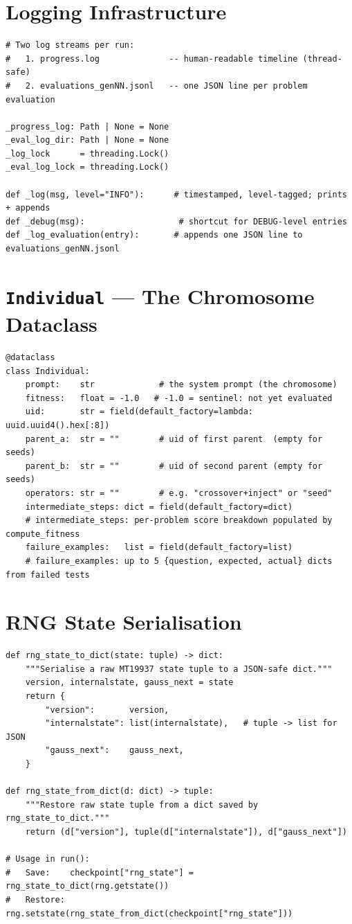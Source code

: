 \documentclass[11pt,a4paper]{report}
\newcommand{\fn}[1]{\texttt{#1}}
\begin{document}
\section{Logging Infrastructure}

\begin{lstlisting}[style=py]
# Two log streams per run:
#   1. progress.log              -- human-readable timeline (thread-safe)
#   2. evaluations_genNN.jsonl   -- one JSON line per problem evaluation

_progress_log: Path | None = None
_eval_log_dir: Path | None = None
_log_lock      = threading.Lock()
_eval_log_lock = threading.Lock()

def _log(msg, level="INFO"):      # timestamped, level-tagged; prints + appends
def _debug(msg):                   # shortcut for DEBUG-level entries
def _log_evaluation(entry):       # appends one JSON line to evaluations_genNN.jsonl
\end{lstlisting}

\section{\fn{Individual} --- The Chromosome Dataclass}

\begin{lstlisting}[style=py]
@dataclass
class Individual:
    prompt:    str             # the system prompt (the chromosome)
    fitness:   float = -1.0   # -1.0 = sentinel: not yet evaluated
    uid:       str = field(default_factory=lambda: uuid.uuid4().hex[:8])
    parent_a:  str = ""        # uid of first parent  (empty for seeds)
    parent_b:  str = ""        # uid of second parent (empty for seeds)
    operators: str = ""        # e.g. "crossover+inject" or "seed"
    intermediate_steps: dict = field(default_factory=dict)
    # intermediate_steps: per-problem score breakdown populated by compute_fitness
    failure_examples:   list = field(default_factory=list)
    # failure_examples: up to 5 {question, expected, actual} dicts from failed tests
\end{lstlisting}

\section{RNG State Serialisation}

\begin{lstlisting}[style=py]
def rng_state_to_dict(state: tuple) -> dict:
    """Serialise a raw MT19937 state tuple to a JSON-safe dict."""
    version, internalstate, gauss_next = state
    return {
        "version":       version,
        "internalstate": list(internalstate),   # tuple -> list for JSON
        "gauss_next":    gauss_next,
    }

def rng_state_from_dict(d: dict) -> tuple:
    """Restore raw state tuple from a dict saved by rng_state_to_dict."""
    return (d["version"], tuple(d["internalstate"]), d["gauss_next"])

# Usage in run():
#   Save:    checkpoint["rng_state"] = rng_state_to_dict(rng.getstate())
#   Restore: rng.setstate(rng_state_from_dict(checkpoint["rng_state"]))
\end{lstlisting}
\end{document}
